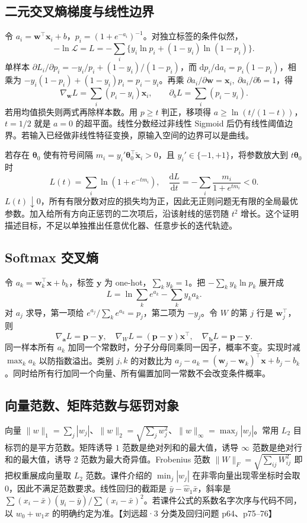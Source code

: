 \documentclass[UTF8,a4paper,zihao=-4,fontset=fandol]{ctexrep}
\begin{document}
\subsection*{二元交叉熵梯度与线性边界}
令 \(a_i=\bm w^\top\bm x_i+b\)，\(p_i=(1+e^{-a_i})^{-1}\)。对独立标签的条件似然，
\[
 -\ln\mathcal L = L
   =-\sum_i\{y_i\ln p_i+(1-y_i)\ln(1-p_i)\}.
\]
单样本 \(\partial L_i/\partial p_i=-y_i/p_i+(1-y_i)/(1-p_i)\)，而 \(\mathrm dp_i/\mathrm da_i=p_i(1-p_i)\)，相乘为 \(-y_i(1-p_i)+(1-y_i)p_i=p_i-y_i\)。再乘 \(\partial a_i/\partial \bm w=\bm x_i,\ \partial a_i/\partial b=1\)，得
\[
 \nabla_{\bm w}L=\sum_i(p_i-y_i)\bm x_i,\qquad
 \partial_bL=\sum_i(p_i-y_i).
\]
若用均值损失则两式再除样本数。用 \(p\ge t\) 判正，移项得 \(a\ge\ln(t/(1-t))\)，\(t=1/2\) 就是 \(a=0\) 的超平面。线性分数经过非线性 Sigmoid 后仍有线性阈值边界。若输入已经做非线性特征变换，原输入空间的边界可以是曲线。
 
若存在 \(\bm\theta_0\) 使有符号间隔 \(m_i=y_i'\bm\theta_0^\top\tilde{\bm x}_i>0\)，且 \(y_i'\in\{-1,+1\}\)，将参数放大到 \(t\bm\theta_0\) 时
\[
 L(t)=\sum_i\ln(1+e^{-tm_i}),\quad
 \frac{\mathrm dL}{\mathrm dt}=-\sum_i\frac{m_i}{1+e^{tm_i}}<0 .
\]
\(L(t)\downarrow0\)，所有有限分数对应的损失均为正，因此无正则问题无有限的全局最优参数。加入给所有方向正惩罚的二次项后，沿该射线的惩罚随 \(t^2\) 增长。这个证明描述目标，不足以单独推出任意优化器、任意步长的迭代轨迹。

\subsection*{Softmax 交叉熵}
令 \(a_k=\bm w_k^\top\bm x+b_k\)，标签 \(\bm y\) 为 one-hot，\(\sum_k y_k=1\)。把 \(-\sum_k y_k\ln p_k\) 展开成
\[
 L=\ln\sum_k e^{a_k}-\sum_k y_ka_k.
\]
对 \(a_j\) 求导，第一项给 \(e^{a_j}/\sum_k e^{a_k}=p_j\)，第二项为 \(-y_j\)。令 \(W\) 的第 \(j\) 行是 \(\bm w_j^\top\)，则
\[
 \nabla_{\bm a}L=\bm p-\bm y,\quad
 \nabla_WL=(\bm p-\bm y)\bm x^\top,\quad
 \nabla_{\bm b}L=\bm p-\bm y.
\]
同一样本所有 \(a_k\) 加同一个常数时，分子分母同乘同一因子，概率不变。实现时减 \(\max_k a_k\) 以防指数溢出。类别 \(j,k\) 的对数比为 \(a_j-a_k=(\bm w_j-\bm w_k)^\top\bm x+b_j-b_k\)。同时给所有行加同一个向量、所有偏置加同一常数不会改变条件概率。

\subsection*{向量范数、矩阵范数与惩罚对象}
向量 $\|w\|_1=\sum_j|w_j|$、$\|w\|_2=\sqrt{\sum_j w_j^2}$、$\|w\|_\infty=\max_j|w_j|$。常用 $L_2$ 目标罚的是平方范数。矩阵诱导 $1$ 范数是绝对列和的最大值，诱导 $\infty$ 范数是绝对行和的最大值，诱导 $2$ 范数为最大奇异值。Frobenius 范数 $\|W\|_F=\sqrt{\sum_{ij}W_{ij}^2}$ 即把权重展成向量取 $L_2$ 范数。课件介绍的 $\min_j|w_j|$ 在非零向量出现零坐标时会取 0，因此不满足范数要求。线性回归的截距是 $\bar y-\hat w_1\bar x$，斜率是 $\sum(x_i-\bar x)(y_i-\bar y)/\sum(x_i-\bar x)^2$。若课件公式的系数名字次序与代码不同，以 $w_0+w_1x$ 的明确约定为准。【刘远超·3 分类及回归问题 p64、p75–76】
\end{document}
